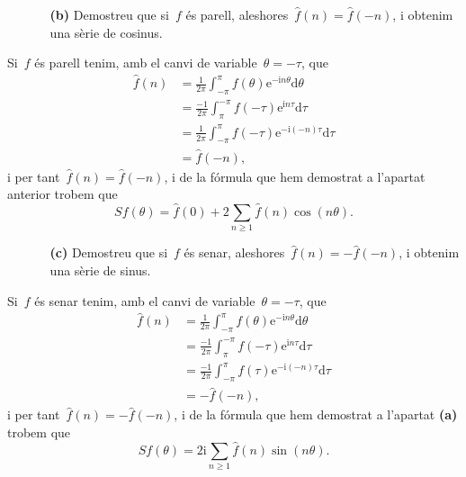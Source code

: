 \documentclass[a4paper]{article}
\newcommand{\iu}{\mathrm{i}}
\newcommand{\e}{\mathrm{e}}
\providecommand{\uppi}{\pi}
\newcommand{\diff}{\mathrm{d}}
\begin{document}
\begin{enumerate}
    \item[]\begin{enumerate}
        \item[\textbf{(b)}] Demostreu que si~\(f\) és parell,
            aleshores~\(\widehat{f}(n) = \widehat{f}(-n)\), i obtenim una sèrie
            de cosinus.
    \end{enumerate}
\end{enumerate}
Si~\(f\) és parell tenim, amb el canvi de variable~\(\theta = -\tau\), que
\begin{align*}
    \widehat{f}(n) &= \frac{1}{2\uppi}
                      \int_{-\uppi}^{\uppi}f(\theta)\e^{-\iu n\theta}\diff
                      \theta \\
                   &= \frac{-1}{2\uppi}
                      \int_{\uppi}^{-\uppi}f(-\tau)\e^{\iu n\tau}\diff
                      \tau \\
                   &= \frac{1}{2\uppi}
                      \int_{-\uppi}^{\uppi}f(-\tau)\e^{-\iu(-n)\tau}\diff
                      \tau \\
                   &= \widehat{f}(-n),
\end{align*}
i per tant~\(\widehat{f}(n) = \widehat{f}(-n)\), i de la fórmula que hem
demostrat a l'apartat anterior trobem que
\[
    Sf(\theta) = \widehat{f}(0) + 2\sum_{n\geq1}\widehat{f}(n)\cos(n\theta).
\]

\begin{enumerate}
    \item[]\begin{enumerate}
        \item[\textbf{(c)}] Demostreu que si~\(f\) és senar,
            aleshores~\(\widehat{f}(n) = -\widehat{f}(-n)\), i obtenim una sèrie
            de sinus.
    \end{enumerate}
\end{enumerate}
Si~\(f\) és senar tenim, amb el canvi de variable~\(\theta = -\tau\), que
\begin{align*}
    \widehat{f}(n) &= \frac{1}{2\uppi}
                      \int_{-\uppi}^{\uppi}f(\theta)\e^{-\iu n\theta}\diff
                      \theta \\
                   &= \frac{-1}{2\uppi}
                      \int_{\uppi}^{-\uppi}f(-\tau)\e^{\iu n\tau}\diff
                      \tau \\
                   &= \frac{-1}{2\uppi}
                      \int_{-\uppi}^{\uppi}f(\tau)\e^{-\iu(-n)\tau}\diff
                      \tau \\
                   &= -\widehat{f}(-n),
\end{align*}
i per tant~\(\widehat{f}(n) = -\widehat{f}(-n)\), i de la fórmula que hem
demostrat a l'apartat \textbf{(a)} trobem que
\[
    Sf(\theta) = 2\iu\sum_{n\geq1}\widehat{f}(n)\sin(n\theta).
\]
\end{document}
